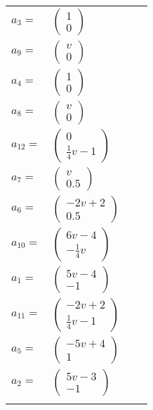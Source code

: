 \documentclass[1p]{elsarticle_modified}
\theoremstyle{definition}
\begin{document}
\begin{tabular}{m{7pt} m{180pt} m{7pt} m{180pt} }
\flushright $a_{3}=$&$\begin{pmatrix}1\\0\end{pmatrix}$ \\
\flushright $a_{9}=$&$\begin{pmatrix}v\\0\end{pmatrix}$ \\
\flushright $a_{4}=$&$\begin{pmatrix}1\\0\end{pmatrix}$ \\
\flushright $a_{8}=$&$\begin{pmatrix}v\\0\end{pmatrix}$ \\
\flushright $a_{12}=$&$\begin{pmatrix}0\\\frac{1}{4} v-1\end{pmatrix}$ \\
\flushright $a_{7}=$&$\begin{pmatrix}v\\0.5\end{pmatrix}$ \\
\flushright $a_{6}=$&$\begin{pmatrix}-2 v+2\\0.5\end{pmatrix}$ \\
\flushright $a_{10}=$&$\begin{pmatrix}6 v-4\\-\frac{1}{4} v\end{pmatrix}$ \\
\flushright $a_{1}=$&$\begin{pmatrix}5 v-4\\-1\end{pmatrix}$ \\
\flushright $a_{11}=$&$\begin{pmatrix}-2 v+2\\\frac{1}{4} v-1\end{pmatrix}$ \\
\flushright $a_{5}=$&$\begin{pmatrix}-5 v+4\\1\end{pmatrix}$ \\
\flushright $a_{2}=$&$\begin{pmatrix}5 v-3\\-1\end{pmatrix}$\\&\end{tabular}
\end{document}
